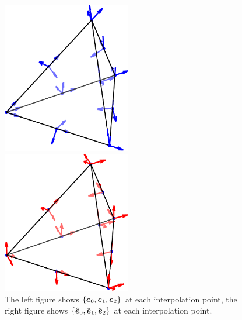 \documentclass[mathpazo]{cicp}
\begin{document}
\begin{figure}[htp]
  \begin{minipage}[t]{0.48\textwidth}
  \centering
  \includegraphics[width=0.5\textwidth]{figures/nedelec_dof.pdf}
  \end{minipage}
  \begin{minipage}[t]{0.48\textwidth}
  \centering
  \includegraphics[width=0.5\textwidth]{figures/nedelec_basis.pdf}
  \end{minipage}
  \caption{The left figure shows $\{\boldsymbol e_0, \boldsymbol e_1, \boldsymbol e_2\}$ at each 
      interpolation point, the right figure shows 
      $\{\hat{ \boldsymbol e}_0, \hat{ \boldsymbol e}_1, \hat{\boldsymbol e}_2\}$ 
      at each interpolation point.}
\end{figure}
\end{document}
